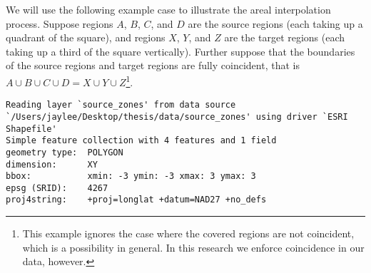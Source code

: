 \documentclass[12pt,twoside]{reedthesis}
\newenvironment{Shaded}{\begin{snugshade}}{\end{snugshade}}
\newcommand{\DataTypeTok}[1]{\textcolor[rgb]{0.13,0.29,0.53}{#1}}
\newcommand{\DecValTok}[1]{\textcolor[rgb]{0.00,0.00,0.81}{#1}}
\newcommand{\KeywordTok}[1]{\textcolor[rgb]{0.13,0.29,0.53}{\textbf{#1}}}
\newcommand{\NormalTok}[1]{#1}
\newcommand{\OperatorTok}[1]{\textcolor[rgb]{0.81,0.36,0.00}{\textbf{#1}}}
\newcommand{\StringTok}[1]{\textcolor[rgb]{0.31,0.60,0.02}{#1}}
\theoremstyle{definition}
\theoremstyle{definition}
\theoremstyle{definition}
\theoremstyle{remark}
\begin{document}
We will use the following example case to illustrate the areal
interpolation process. Suppose regions \(A\), \(B\), \(C\), and \(D\)
are the source regions (each taking up a quadrant of the square), and
regions \(X\), \(Y\), and \(Z\) are the target regions (each taking up a
third of the square vertically). Further suppose that the boundaries of
the source regions and target regions are fully coincident, that is
\(A \cup B \cup C \cup D = X \cup Y \cup Z\)\footnote{This example
  ignores the case where the covered regions are not coincident, which
  is a possibility in general. In this research we enforce coincidence
  in our data, however.}.
\begin{Shaded}
\end{Shaded}
\begin{verbatim}
Reading layer `source_zones' from data source `/Users/jaylee/Desktop/thesis/data/source_zones' using driver `ESRI Shapefile'
Simple feature collection with 4 features and 1 field
geometry type:  POLYGON
dimension:      XY
bbox:           xmin: -3 ymin: -3 xmax: 3 ymax: 3
epsg (SRID):    4267
proj4string:    +proj=longlat +datum=NAD27 +no_defs
\end{verbatim}
\begin{Shaded}
\end{Shaded}
\end{document}
